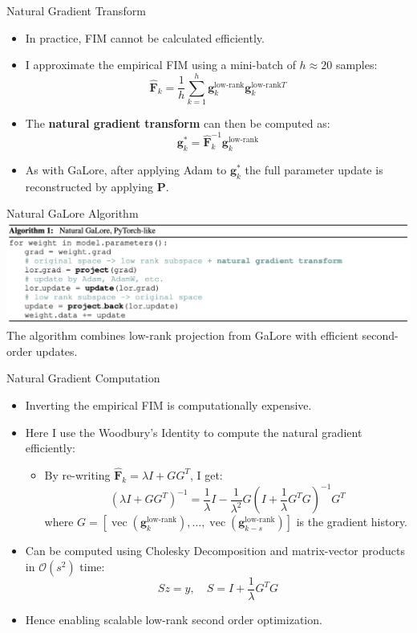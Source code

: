 \documentclass{beamer}
\begin{document}
\begin{frame}{Natural Gradient Transform}
    \begin{itemize}
        \item In practice, FIM cannot be calculated efficiently.
        \item I approximate the empirical FIM using a mini-batch of \(h \approx 20\) samples:
        \[
            \mathbf{\hat{F}}_k = \frac{1}{h} \sum_{k=1}^{h} \mathbf{g}_{k}^{\text{low-rank}} \mathbf{g}_{k}^{\text{low-rank} T}
        \]
        \item The \textbf{natural gradient transform} can then be computed as:
        \[
            \mathbf{g}_k^* = \mathbf{\hat{F}}_k^{-1} \mathbf{g}_{k}^{\text{low-rank}}
        \]
        \item As with GaLore, after applying Adam to \(\mathbf{g}_k^*\) the full parameter update is reconstructed by applying \(\mathbf{P}\).
    \end{itemize}
\end{frame}

\begin{frame}{Natural GaLore Algorithm}
    \includegraphics[width=\textwidth]{figures/natural_galore_algorithm.png}
    The algorithm combines low-rank projection from GaLore with efficient second-order updates.
\end{frame}

\begin{frame}{Natural Gradient Computation}
    \begin{itemize}
        \item Inverting the empirical FIM is computationally expensive.
        \item Here I use the Woodbury's Identity to compute the natural gradient efficiently:
            \begin{itemize}
                \item By re-writing \(\mathbf{\hat{F}}_k = \lambda I + GG^T\), I get:
                    \[
                    (\lambda I + GG^T)^{-1} = \frac{1}{\lambda} I - \frac{1}{\lambda^2} G (I + \frac{1}{\lambda} G^T G)^{-1} G^T
                    \]
                    where \(G = [\operatorname{vec}(\mathbf{g}_{k}^{\text{low-rank}}), \ldots, \operatorname{vec}(\mathbf{g}_{k-s}^{\text{low-rank}})]\) is the gradient history.
            \end{itemize}
        \item Can be computed using Cholesky Decomposition and matrix-vector products in \(\mathcal{O}(s^2)\) time:
                \[
                    S z = y, \quad S = I + \frac{1}{\lambda} G^T G
                \]
        \item Hence enabling scalable low-rank second order optimization.
    \end{itemize}
\end{frame}
\end{document}

